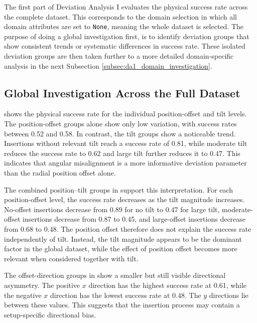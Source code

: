 The first part of Deviation Analysis I evaluates the physical success rate across the complete dataset. This corresponds to the domain selection in which all domain attributes are set to \texttt{None}, meaning the whole dataset is selected. The purpose of doing a global investigation first, is to identify deviation groups that show consistent trends or systematic differences in success rate. These isolated deviation groups are then taken further to a more detailed domain-specific analysis in the next Subsection \ref{subsec:da1_domain_investigation}.

\subsection{Global Investigation Across the Full Dataset}
\label{subsec:da1_global_screening}

 shows the physical success rate for the individual position-offset and tilt levels. The position-offset groups alone show only low variation, with success rates between 0.52 and 0.58. In contrast, the tilt groups show a noticeable trend. Insertions without relevant tilt reach a success rate of 0.81, while moderate tilt reduces the success rate to 0.62 and large tilt further reduces it to 0.47. This indicates that angular misalignment is a more informative deviation parameter than the radial position offset alone.

The combined position--tilt groups in  support this interpretation. For each position-offset level, the success rate decreases as the tilt magnitude increases. No-offset insertions decrease from 0.89 for no tilt to 0.47 for large tilt, moderate-offset insertions decrease from 0.87 to 0.45, and large-offset insertions decrease from 0.68 to 0.48. The position offset therefore does not explain the success rate independently of tilt. Instead, the tilt magnitude appears to be the dominant factor in the global dataset, while the effect of position offset becomes more relevant when considered together with tilt.

The offset-direction groups in  show a smaller but still visible directional asymmetry. The positive $x$ direction has the highest success rate at 0.61, while the negative $x$ direction has the lowest success rate at 0.48. The $y$ directions lie between these values. This suggests that the insertion process may contain a setup-specific directional bias.

